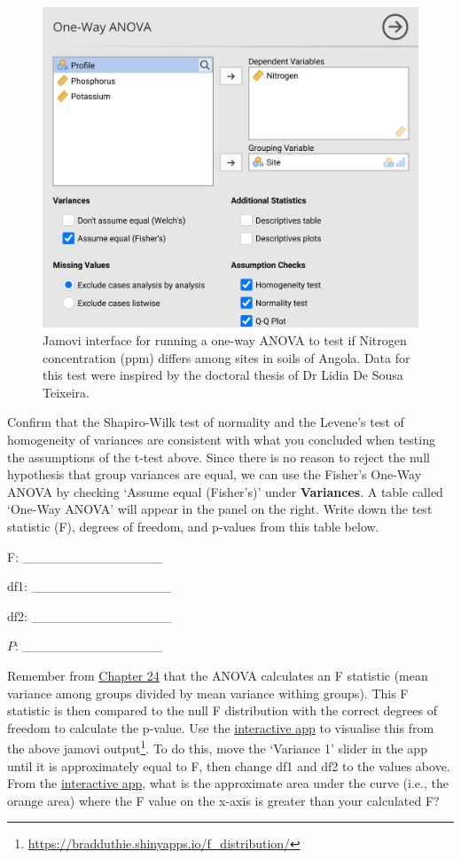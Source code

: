 \documentclass[
  openany]{scrbook}
\begin{document}
\begin{figure}
\includegraphics[width=1\linewidth]{img/jamovi_one-way_ANOVA_analysis} \caption{Jamovi interface for running a one-way ANOVA to test if Nitrogen concentration (ppm) differs among sites in soils of Angola. Data for this test were inspired by the doctoral thesis of Dr Lidia De Sousa Teixeira.}\label{fig:unnamed-chunk-112}
\end{figure}

Confirm that the Shapiro-Wilk test of normality and the Levene's test of homogeneity of variances are consistent with what you concluded when testing the assumptions of the t-test above.
Since there is no reason to reject the null hypothesis that group variances are equal, we can use the Fisher's One-Way ANOVA by checking `Assume equal (Fisher's)' under \textbf{Variances}.
A table called `One-Way ANOVA' will appear in the panel on the right.
Write down the test statistic (F), degrees of freedom, and p-values from this table below.

F: \_\_\_\_\_\_\_\_\_\_\_\_\_\_\_

df1: \_\_\_\_\_\_\_\_\_\_\_\_\_\_\_

df2: \_\_\_\_\_\_\_\_\_\_\_\_\_\_\_

\(P\): \_\_\_\_\_\_\_\_\_\_\_\_\_\_\_

Remember from \protect\hyperlink{Chapter_24}{Chapter 24} that the ANOVA calculates an F statistic (mean variance among groups divided by mean variance withing groups).
This F statistic is then compared to the null F distribution with the correct degrees of freedom to calculate the p-value.
Use the \href{https://bradduthie.shinyapps.io/f_distribution/}{interactive app} to visualise this from the above jamovi output\footnote{\url{https://bradduthie.shinyapps.io/f_distribution/}}.
To do this, move the `Variance 1' slider in the app until it is approximately equal to F, then change df1 and df2 to the values above.
From the \href{https://bradduthie.shinyapps.io/f_distribution/}{interactive app}, what is the approximate area under the curve (i.e., the orange area) where the F value on the x-axis is greater than your calculated F?
\end{document}
